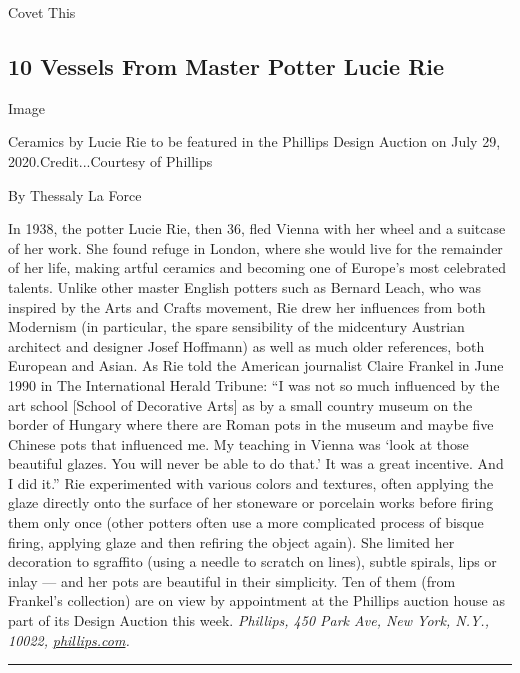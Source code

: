 Covet This

\hypertarget{10-vessels-from-master-potter-lucie-rie}{%
\subsection{10 Vessels From Master Potter Lucie
Rie}\label{10-vessels-from-master-potter-lucie-rie}}

Image

Ceramics by Lucie Rie to be featured in the Phillips Design Auction on
July 29, 2020.Credit...Courtesy of Phillips

By Thessaly La Force

In 1938, the potter Lucie Rie, then 36, fled Vienna with her wheel and a
suitcase of her work. She found refuge in London, where she would live
for the remainder of her life, making artful ceramics and becoming one
of Europe's most celebrated talents. Unlike other master English potters
such as Bernard Leach, who was inspired by the Arts and Crafts movement,
Rie drew her influences from both Modernism (in particular, the spare
sensibility of the midcentury Austrian architect and designer Josef
Hoffmann) as well as much older references, both European and Asian. As
Rie told the American journalist Claire Frankel in June 1990 in The
International Herald Tribune: ``I was not so much influenced by the art
school {[}School of Decorative Arts{]} as by a small country museum on
the border of Hungary where there are Roman pots in the museum and maybe
five Chinese pots that influenced me. My teaching in Vienna was `look at
those beautiful glazes. You will never be able to do that.' It was a
great incentive. And I did it.'' Rie experimented with various colors
and textures, often applying the glaze directly onto the surface of her
stoneware or porcelain works before firing them only once (other potters
often use a more complicated process of bisque firing, applying glaze
and then refiring the object again). She limited her decoration to
sgraffito (using a needle to scratch on lines), subtle spirals, lips or
inlay --- and her pots are beautiful in their simplicity. Ten of them
(from Frankel's collection) are on view by appointment at the Phillips
auction house as part of its Design Auction this week. \emph{Phillips,
450 Park Ave, New York, N.Y., 10022,}
\href{https://www.phillips.com/artist/711/lucie-rie}{\emph{phillips.com}}\emph{.}

\begin{center}\rule{0.5\linewidth}{\linethickness}\end{center}


